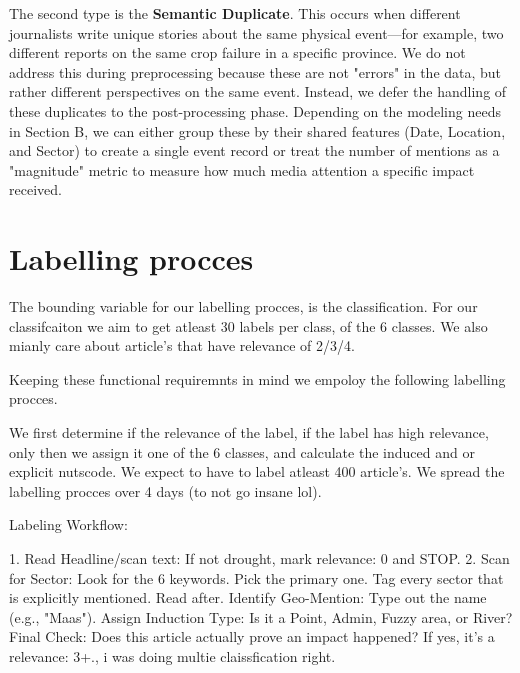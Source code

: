 The second type is the \textbf{Semantic Duplicate}. This occurs when different journalists write unique stories about the same physical event—for example, two different reports on the same crop failure in a specific province. We do not address this during preprocessing because these are not "errors" in the data, but rather different perspectives on the same event. Instead, we defer the handling of these duplicates to the post-processing phase. Depending on the modeling needs in Section B, we can either group these by their shared features (Date, Location, and Sector) to create a single event record or treat the number of mentions as a "magnitude" metric to measure how much media attention a specific impact received.

\section{Labelling procces}

The bounding variable for our labelling procces, is the classification. For our classifcaiton we aim to get atleast 30 labels per class, of the 6 classes. We also mianly care about article's that have relevance of 2/3/4. 

Keeping these functional requiremnts in mind we empoloy the following labelling procces. 

We first determine if the relevance of the label, if the label has high relevance, only then we assign it one of the 6 classes, and calculate the induced and or explicit nutscode.
We expect to have to label atleast 400 article's. We spread the labelling procces over 4 days (to not go insane lol).

Labeling Workflow: 


1. Read Headline/scan text: If not drought, mark relevance: 0 and STOP.
2. Scan for Sector: Look for the 6 keywords. Pick the primary one. Tag every sector that is explicitly mentioned. Read after.
Identify Geo-Mention: Type out the name (e.g., "Maas").
Assign Induction Type: Is it a Point, Admin, Fuzzy area, or River?
Final Check: Does this article actually prove an impact happened? If yes, it’s a relevance: 3+., i was doing multie claissfication right.




